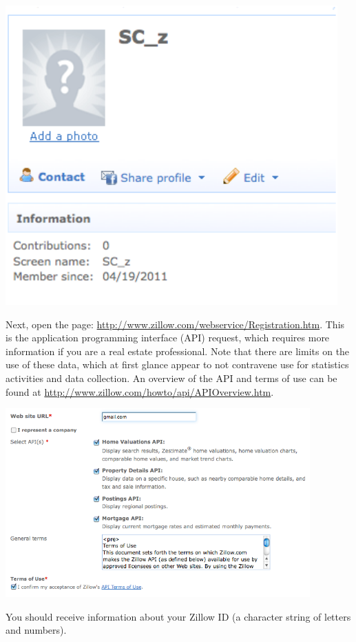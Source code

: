 \centerline{\includegraphics{images/zillow_profile.pdf}}

Next, 
open the page: \url{http://www.zillow.com/webservice/Registration.htm}.  This
is the application programming interface (API) request, which requires more information
if you are a real estate professional.  Note that there are limits on the use 
of these data, which at first glance appear to not contravene use for statistics
activities and data collection. An overview of the API and terms of use can be found
at \url{http://www.zillow.com/howto/api/APIOverview.htm}.

\centerline{\includegraphics[width=4.6in]{images/zillow_api.pdf}}

You should receive information about your Zillow ID (a character string
of letters and numbers).  

